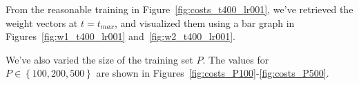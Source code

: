 From the reasonable training in Figure~\ref{fig:costs_t400_lr001}, we've retrieved the weight vectors at \(t = t_{max}\), and visualized them using a bar graph in Figures~\ref{fig:w1_t400_lr001} and~\ref{fig:w2_t400_lr001}.


We've also varied the size of the training set \(P\).
The values for \( P \in \left\{100, 200, 500\right\}\) are shown in Figures~\ref{fig:costs_P100}-\ref{fig:costs_P500}.


